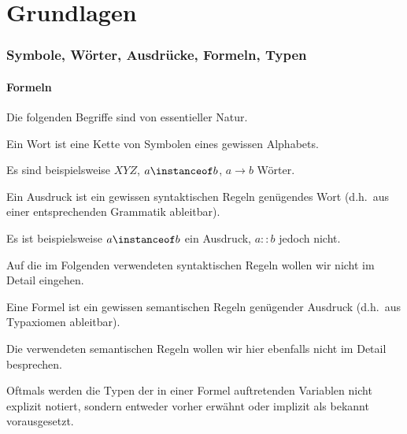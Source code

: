 \part{Grundlagen}

\section{Symbole, Wörter, Ausdrücke, Formeln, Typen}

\subsection{Formeln}

Die folgenden Begriffe sind von essentieller Natur.

\begin{definition}[Wort]
    Ein Wort ist eine Kette von Symbolen eines gewissen Alphabets.
\end{definition}

\begin{example}
    Es sind beispielsweise $XYZ$, $a\instanceof b$, $a\to b$ Wörter.
\end{example}

\begin{definition}[Ausdruck]
    Ein Ausdruck ist ein gewissen syntaktischen Regeln genügendes Wort (d.h.~aus einer
    entsprechenden Grammatik ableitbar).
\end{definition}

\begin{example}
    Es ist beispielsweise $a\instanceof b$ ein Ausdruck, $a::b$ jedoch nicht.
\end{example}

Auf die im Folgenden verwendeten syntaktischen Regeln wollen wir nicht im Detail eingehen.

\begin{definition}[Formel]
    Eine Formel ist ein gewissen semantischen Regeln genügender Ausdruck (d.h.~aus Typaxiomen ableitbar).
\end{definition}

Die verwendeten semantischen Regeln wollen wir hier ebenfalls nicht im Detail besprechen.

\begin{convention}
    Oftmals werden die Typen der in einer Formel auftretenden
Variablen nicht explizit notiert, sondern entweder vorher erwähnt oder implizit als bekannt
vorausgesetzt.
\end{convention}

